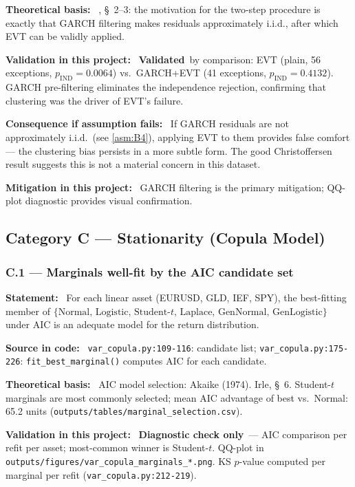 \documentclass[11pt,a4paper]{article}
\newcommand{\asmfield}[1]{\medskip\noindent\textbf{#1:}\ }
\newcommand{\code}[1]{\texttt{#1}}
\newcommand{\validated}{\textbf{Validated}}
\newcommand{\diagnostic}{\textbf{Diagnostic check only}}
\begin{document}
\asmfield{Theoretical basis}
\cite{McNeilFrey2000}, \S~2--3: the motivation for the two-step procedure
is exactly that GARCH filtering makes residuals approximately i.i.d., after
which EVT can be validly applied.

\asmfield{Validation in this project}
\validated\ by comparison: EVT (plain, 56 exceptions, $p_{\mathrm{IND}} =
0.0064$) vs.\ GARCH+EVT (41 exceptions, $p_{\mathrm{IND}} = 0.4132$).
GARCH pre-filtering eliminates the independence rejection, confirming that
clustering was the driver of EVT's failure.

\asmfield{Consequence if assumption fails}
If GARCH residuals are not approximately i.i.d.\ (see \cref{asm:B4}),
applying EVT to them provides false comfort --- the clustering bias
persists in a more subtle form. The good Christoffersen result suggests
this is not a material concern in this dataset.

\asmfield{Mitigation in this project}
GARCH filtering is the primary mitigation; QQ-plot diagnostic provides
visual confirmation.

\subsection{Category C --- Stationarity (Copula Model)}\label{sec:catC}

\subsubsection{C.1 --- Marginals well-fit by the AIC candidate set}\label{asm:C1}

\asmfield{Statement}
For each linear asset (EURUSD, GLD, IEF, SPY), the best-fitting member of
$\{\text{Normal, Logistic, Student-}t\text{, Laplace, GenNormal,
GenLogistic}\}$ under AIC is an adequate model for the return distribution.

\asmfield{Source in code}
\code{var\_copula.py:109-116}: candidate list; \code{var\_copula.py:175-226}:
\code{fit\_best\_marginal()} computes AIC for each candidate.

\asmfield{Theoretical basis}
AIC model selection: Akaike (1974). Irle, \S~6. Student-$t$ marginals are
most commonly selected; mean AIC advantage of best vs.\ Normal: 65.2 units
(\code{outputs/tables/marginal\_selection.csv}).

\asmfield{Validation in this project}
\diagnostic\ --- AIC comparison per refit per asset; most-common winner is
Student-$t$. QQ-plot in \code{outputs/figures/var\_copula\_marginals\_*.png}.
KS $p$-value computed per marginal per refit (\code{var\_copula.py:212-219}).
\end{document}
